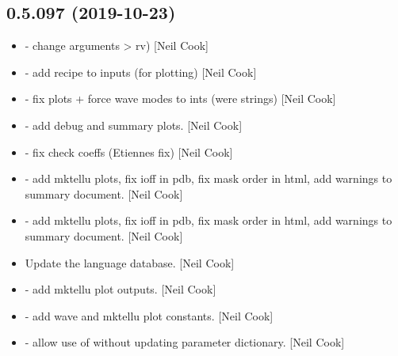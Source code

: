 \documentclass[a4paper,10pt,english]{report}
\begin{document}
\subsection{0.5.097 (2019-10-23)}
\label{\detokenize{misc/changelog:id45}}\begin{itemize}
\item {} 
 - change arguments  \textendash{}\textgreater{} rv) {[}Neil
Cook{]}

\item {} 
 - add recipe to inputs (for plotting)
{[}Neil Cook{]}

\item {} 
 - fix plots + force wave modes to ints (were
strings) {[}Neil Cook{]}

\item {} 
 - add debug and summary plots. {[}Neil
Cook{]}

\item {} 
 - fix check coeffs (Etiennes fix)
{[}Neil Cook{]}

\item {} 
 - add mktellu plots, fix ioff in pdb, fix mask order in
html, add warnings to summary document. {[}Neil Cook{]}

\item {} 
 - add mktellu plots, fix ioff in pdb, fix mask order in
html, add warnings to summary document. {[}Neil Cook{]}

\item {} 
Update the language database. {[}Neil Cook{]}

\item {} 
 - add mktellu plot
outputs. {[}Neil Cook{]}

\item {} 
 - add wave and mktellu plot
constants. {[}Neil Cook{]}

\item {} 
 - allow use of  without updating parameter
dictionary. {[}Neil Cook{]}

\end{itemize}
\end{document}
